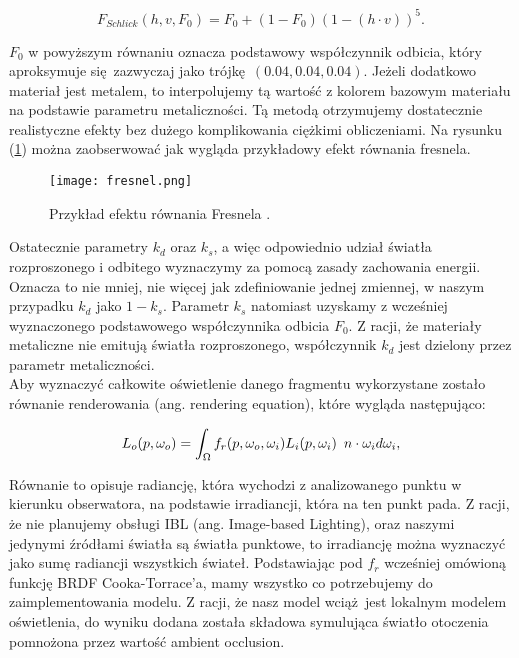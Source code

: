 \begin{equation}
	F_{Schlick}(h, v, F_0) = F_0 + (1-F_0)(1-(h\cdot v))^5.
\end{equation}

$F_0$ w powyższym równaniu oznacza podstawowy współczynnik odbicia, który aproksymuje się zazwyczaj jako trójkę $(0.04,0.04,0.04)$. Jeżeli dodatkowo materiał jest metalem, to interpolujemy tą wartość z kolorem bazowym materiału na podstawie parametru metaliczności. Tą metodą otrzymujemy dostatecznie realistyczne efekty bez dużego komplikowania ciężkimi obliczeniami. Na rysunku (\ref{fresnel}) można zaobserwować jak wygląda przykładowy efekt równania fresnela.
\\

\begin{figure}[h]
	\centering
	\texttt{[image: fresnel.png]}
	\caption{Przykład efektu równania Fresnela \cite{learnopengl}.}
	\label{fresnel}
\end{figure}

Ostatecznie parametry $k_d$ oraz $k_s$, a więc odpowiednio udział światła rozproszonego i odbitego wyznaczymy za pomocą zasady zachowania energii. Oznacza to nie mniej, nie więcej jak zdefiniowanie jednej zmiennej, w naszym przypadku $k_d$ jako $1 - k_s$. Parametr $k_s$ natomiast uzyskamy z wcześniej wyznaczonego podstawowego współczynnika odbicia $F_0$. Z racji, że materiały metaliczne nie emitują światła rozproszonego, współczynnik $k_d$ jest dzielony przez parametr metaliczności.
\\

Aby wyznaczyć całkowite oświetlenie danego fragmentu wykorzystane zostało równanie renderowania (ang. rendering equation), które wygląda następująco:

$$
L_o(p, \omega_o) = \int_\Omega f_r(p, \omega_o, \omega_i)L_i(p, \omega_i) \hspace{0.5em} n \cdot \omega_i d\omega_i,
$$ 

Równanie to opisuje radiancję, która wychodzi z analizowanego punktu w kierunku obserwatora, na podstawie irradiancji, która na ten punkt pada. Z racji, że nie planujemy obsługi IBL (ang. Image-based Lighting), oraz naszymi jedynymi źródłami światła są światła punktowe, to irradiancję można wyznaczyć jako sumę radiancji wszystkich świateł. Podstawiając pod $f_r$ wcześniej omówioną funkcję BRDF Cooka-Torrace'a, mamy wszystko co potrzebujemy do zaimplementowania modelu. Z racji, że nasz model wciąż jest lokalnym modelem oświetlenia, do wyniku dodana została składowa symulująca światło otoczenia pomnożona przez wartość ambient occlusion.
\\

